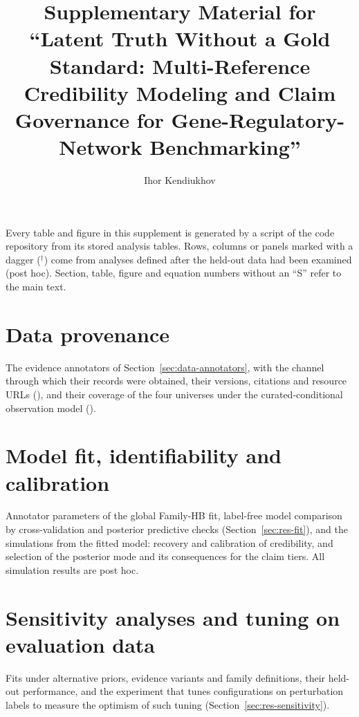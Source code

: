 \documentclass[11pt,a4paper]{article}
\title{Supplementary Material for\\ ``Latent Truth Without a Gold Standard: Multi-Reference Credibility Modeling and Claim Governance for Gene-Regulatory-Network Benchmarking''}
\author{Ihor Kendiukhov}
\date{}
\begin{document}
\maketitle

\noindent Every table and figure in this supplement is generated by a script of the code repository from its stored analysis tables. Rows, columns or panels marked with a dagger ($^\dagger$) come from analyses defined after the held-out data had been examined (post hoc). Section, table, figure and equation numbers without an ``S'' refer to the main text.

\section{Data provenance}\label{sec:S-data}
The evidence annotators of Section~\ref{sec:data-annotators}, with the channel through which their records were obtained, their versions, citations and resource URLs (), and their coverage of the four universes under the curated-conditional observation model ().



\clearpage
\section{Model fit, identifiability and calibration}\label{sec:S-fit}
Annotator parameters of the global Family-HB fit, label-free model comparison by cross-validation and posterior predictive checks (Section~\ref{sec:res-fit}), and the simulations from the fitted model: recovery and calibration of credibility, and selection of the posterior mode and its consequences for the claim tiers. All simulation results are post hoc.









\clearpage
\section{Sensitivity analyses and tuning on evaluation data}\label{sec:S-sens}
Fits under alternative priors, evidence variants and family definitions, their held-out performance, and the experiment that tunes configurations on perturbation labels to measure the optimism of such tuning (Section~\ref{sec:res-sensitivity}).





\end{document}
